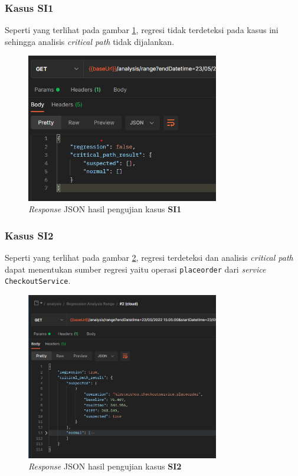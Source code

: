 \subsubsection{Kasus SI1}
Seperti yang terlihat pada gambar \ref{result_json_1}, regresi tidak terdeteksi pada kasus ini sehingga analisis \textit{critical path} tidak dijalankan.
\begin{figure}[!htb]
	\centering
	\includegraphics[width=0.75\textwidth]{resources/ch4/json/1.png}
	\caption{\textit{Response} JSON hasil pengujian kasus \textbf{SI1}}
	\label{result_json_1}
\end{figure}

\pagebreak


\subsubsection{Kasus SI2}
Seperti yang terlihat pada gambar \ref{result_json_2}, regresi terdeteksi dan analisis \textit{critical path} dapat menentukan sumber regresi yaitu operasi \texttt{placeorder} dari \textit{service} \texttt{CheckoutService}.
\begin{figure}[!htb]
	\centering
	\includegraphics[width=0.75\textwidth]{resources/ch4/json/2.png}
	\caption{\textit{Response} JSON hasil pengujian kasus \textbf{SI2}}
	\label{result_json_2}
\end{figure}

